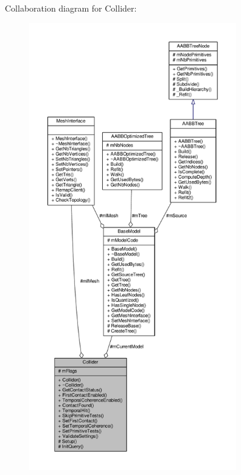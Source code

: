 Collaboration diagram for Collider\+:
\nopagebreak
\begin{figure}[H]
\begin{center}
\leavevmode
\includegraphics[height=550pt]{d1/d15/classCollider__coll__graph}
\end{center}
\end{figure}

